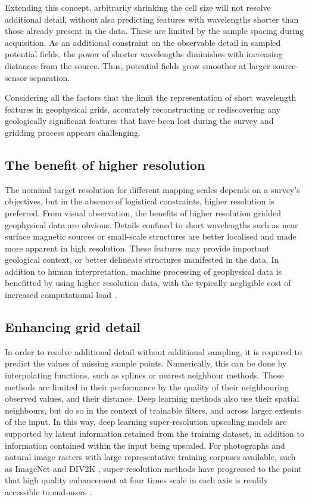 \documentclass{article}
\begin{document}
Extending this concept, arbitrarily shrinking the cell size will not resolve additional detail, without also predicting features with wavelengths shorter than those already present in the data.
These are limited by the sample spacing during acquisition.
As an additional constraint on the observable detail in sampled potential fields, the power of shorter wavelengths diminishes with increasing distances from the source.
Thus, potential fields grow smoother at larger source-sensor separation.

Considering all the factors that the limit the representation of short wavelength features in geophysical grids, accurately reconstructing or rediscovering any geologically significant features that have been lost during the survey and gridding process appears challenging.

\subsection{The benefit of higher resolution}
The nominal target resolution for different mapping scales depends on a survey's objectives, but in the absence of logistical constraints, higher resolution is preferred.
From visual observation, the benefits of higher resolution gridded geophysical data are obvious.
Details confined to short wavelengths such as near surface magnetic sources or small-scale structures are better localised and made more apparent in high resolution.
These features may provide important geological context, or better delineate structures manifested in the data.
In addition to human interpretation, machine processing of geophysical data is benefitted by using higher resolution data, with the typically negligible cost of increased computational load \parencite[e.g.][]{fitzgeraldArtificialIntelligenceTechniques2021}.

\subsection{Enhancing grid detail}
In order to resolve additional detail without additional sampling, it is required to predict the values of missing sample points.
Numerically, this can be done by interpolating functions, such as splines \parencite{keysCubicConvolutionInterpolation1981} or nearest neighbour methods.
These methods are limited in their performance by the quality of their neighbouring observed values, and their distance.
Deep learning methods also use their spatial neighbours, but do so in the context of trainable filters, and across larger extents of the input.
In this way, deep learning super-resolution upscaling models are supported by latent information retained from the training dataset, in addition to information contained within the input being upscaled.
For photographs and natural image rasters with large representative training corpuses available, such as ImageNet \parencite{dengImageNetLargescaleHierarchical2009} and DIV2K \parencite{agustssonNTIRE2017Challenge2017}, super-resolution methods have progressed to the point that high quality enhancement at four times scale in each axis is readily accessible to end-users \parencite[e.g.][]{wangRealESRGANTrainingRealWorld2021}.
\end{document}
